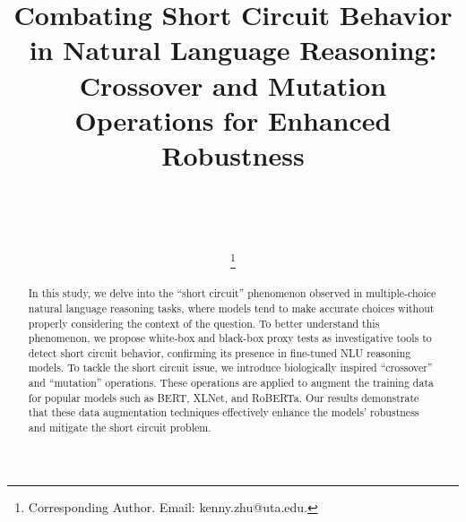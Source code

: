 \documentclass{ecai}  %
\begin{document}
\begin{frontmatter}

\title{Combating Short Circuit Behavior in Natural Language Reasoning: Crossover and Mutation Operations for Enhanced Robustness}

\author[A]{~}
\author[B]{~}
\author[C]{\thanks{Corresponding Author. Email: kenny.zhu@uta.edu.}}

\address[A]{Shanghai Jiao Tong University, China}
\address[B]{Shanghai Jiao Tong University, China}
\address[C]{University of Texas at Arlington, United States}


\begin{abstract}
In this study, we delve into the ``short circuit'' phenomenon observed in multiple-choice natural language reasoning tasks, where models tend to make accurate choices without properly considering the context of the question. To better understand this phenomenon, we propose white-box and black-box proxy tests as investigative tools to detect short circuit behavior, confirming its presence in fine-tuned NLU reasoning models.
To tackle the short circuit issue, we introduce biologically inspired ``crossover'' and ``mutation'' operations. These operations are applied to augment the training data for popular models such as BERT, XLNet, and RoBERTa. Our results demonstrate that these data augmentation techniques effectively enhance the models' robustness and mitigate the short circuit problem.
\end{abstract}



\end{frontmatter}






\end{document}
